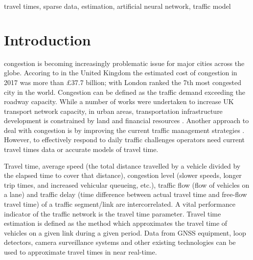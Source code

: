 \documentclass[journal]{IEEEtran}
\begin{document}
\begin{IEEEkeywords}
travel times, sparse data, estimation, artificial neural network, traffic model
\end{IEEEkeywords}






%
\IEEEpeerreviewmaketitle



\section{Introduction}
\label{sec:introduction}
% 
% 
% 
% 
 congestion is becoming increasingly problematic issue for major cities across the globe. Accoring to \cite{Cookson2017} in the United Kingdom the estimated cost of congestion in 2017 was more than $\pounds$37.7 billion; with London ranked the 7th most congested city in the world. Congestion can be defined as the traffic demand exceeding the roadway capacity. While a number of works were undertaken to increase UK transport network capacity, in urban areas, transportation infrastructure development is constrained by land and financial resources \cite{Petrovska2015}. Another approach to deal with congestion is by improving the current traffic management strategies \cite{Capes2005}. However, to effectively respond to daily traffic challenges operators need current travel times data or accurate models of travel time. 


Travel time, average speed (the total distance travelled by a vehicle divided by the elapsed time to cover that distance), congestion level (slower speeds, longer trip times, and increased vehicular queueing, etc.), traffic flow (flow of vehicles on a lane) and traffic delay (time difference between actual travel time and free-flow travel time) of a traffic segment/link are intercorrelated. A vital performance indicator of the traffic network is the travel time parameter. Travel time estimation is defined as the method which approximates the travel time of vehicles on a given link during a given period. Data from GNSS equipment, loop detectors, camera surveillance systems and other existing technologies can be used to approximate travel times in near real-time.
\end{document}
